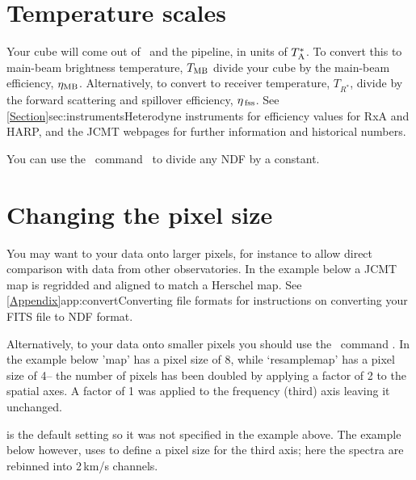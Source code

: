 \documentclass[11pt,oneside,chapters]{starlink}
\providecommand{\sqorst}{\xref{\task{sqorst}}{sun95}{SQORST}}
\begin{document}
\section{Temperature scales}
\label{sec:mult}

Your cube will come out of \makecube\, and the pipeline, in units of
$T_{\textnormal{A}}^*$. To convert this to main-beam brightness temperature, $T_{\textnormal{MB}}$
divide your cube by the main-beam efficiency, $\eta_{\textnormal{MB}}$. Alternatively,
to convert to receiver temperature, $T_{R^{*}}$, divide by the forward
scattering and spillover efficiency, $\eta_{\textnormal{\,fss}}$.  See
\cref{Section}{sec:instruments}{Heterodyne instruments} for efficiency
values for RxA and HARP, and the JCMT webpages for further information
and historical numbers.

You can use the \Kappa\ command \cdiv\ to divide any NDF by a constant.

\begin{terminalv}
\end{terminalv}

\section{Changing the pixel size}
\label{sec:rebin}

You may want to  your data onto
larger pixels, for instance to
allow direct comparison with data from other observatories. In the
example below a JCMT map is regridded and aligned to match a Herschel
map. See \cref{Appendix}{app:convert}{Converting file formats} for
instructions on converting your FITS file to NDF format.
\begin{terminalv}
\end{terminalv}

Alternatively, to  your data onto smaller
pixels you should
use the \Kappa\ command \sqorst. In the example below 'map' has a
pixel size of 8\arcsec, while `resamplemap' has a pixel size of 4\arcsec --
the number of pixels has been doubled by applying a factor of 2 to the
spatial axes. A factor of 1 was applied to the frequency (third) axis
leaving it unchanged.
\begin{terminalv}
\end{terminalv}
 is the default setting so it was not specified in
the example above. The example below however, uses
 to define a pixel size for the third axis;
here the spectra are rebinned into 2\,km/s channels.
\begin{terminalv}
\end{terminalv}
\end{document}
